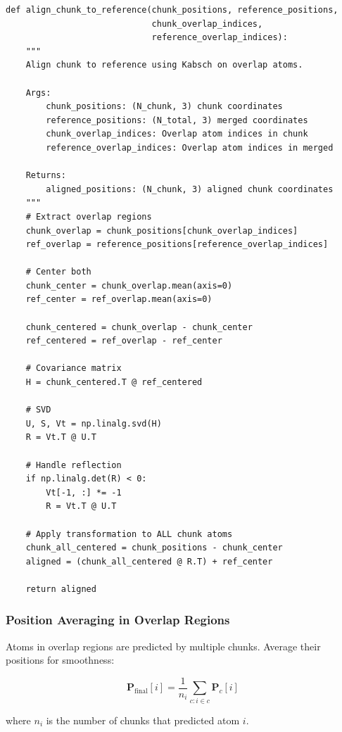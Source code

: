 \documentclass[11pt,a4paper]{article}
\begin{document}
\begin{lstlisting}[caption={Align Chunk to Reference}]
def align_chunk_to_reference(chunk_positions, reference_positions,
                             chunk_overlap_indices,
                             reference_overlap_indices):
    """
    Align chunk to reference using Kabsch on overlap atoms.

    Args:
        chunk_positions: (N_chunk, 3) chunk coordinates
        reference_positions: (N_total, 3) merged coordinates
        chunk_overlap_indices: Overlap atom indices in chunk
        reference_overlap_indices: Overlap atom indices in merged

    Returns:
        aligned_positions: (N_chunk, 3) aligned chunk coordinates
    """
    # Extract overlap regions
    chunk_overlap = chunk_positions[chunk_overlap_indices]
    ref_overlap = reference_positions[reference_overlap_indices]

    # Center both
    chunk_center = chunk_overlap.mean(axis=0)
    ref_center = ref_overlap.mean(axis=0)

    chunk_centered = chunk_overlap - chunk_center
    ref_centered = ref_overlap - ref_center

    # Covariance matrix
    H = chunk_centered.T @ ref_centered

    # SVD
    U, S, Vt = np.linalg.svd(H)
    R = Vt.T @ U.T

    # Handle reflection
    if np.linalg.det(R) < 0:
        Vt[-1, :] *= -1
        R = Vt.T @ U.T

    # Apply transformation to ALL chunk atoms
    chunk_all_centered = chunk_positions - chunk_center
    aligned = (chunk_all_centered @ R.T) + ref_center

    return aligned
\end{lstlisting}

\subsubsection{Position Averaging in Overlap Regions}

Atoms in overlap regions are predicted by multiple chunks. Average their positions for smoothness:

\begin{equation}
\mathbf{P}_{\text{final}}[i] = \frac{1}{n_i} \sum_{c: i \in c} \mathbf{P}_c[i]
\end{equation}

where $n_i$ is the number of chunks that predicted atom $i$.
\end{document}
